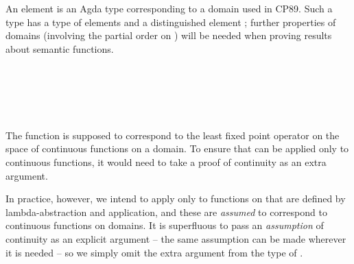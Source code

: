 \begin{AgdaAlign}
An element  is an Agda type corresponding to a domain used in CP89.
Such a type  has a type of elements 
and a distinguished element ;
further properties of domains
(involving the partial order on )
will be needed when proving results about semantic functions.
%
\begin{code}%
\>[0]\AgdaSpace{}%
\<%
\\
\>[0][@{}l@{\AgdaIndent{0}}]%
\>[4]\AgdaSymbol{(}\AgdaSpace{}%
%
\>[14]\AgdaSymbol{:}%
\>[17]\AgdaSpace{}%
\AgdaSymbol{)}\<%
\\
%
\>[4]\AgdaSymbol{(}\AgdaSpace{}%
%
\>[14]\AgdaSymbol{:}%
\>[17]\AgdaSpace{}%
\AgdaSpace{}%
\AgdaSpace{}%
\AgdaSymbol{)}\<%
\\
%
\>[4]\AgdaSymbol{(}\AgdaSpace{}%
%
\>[14]\AgdaSymbol{:}%
\>[17]\AgdaSymbol{\{}\AgdaSpace{}%
\AgdaSymbol{:}\AgdaSpace{}%
\AgdaSymbol{\}}\AgdaSpace{}%
\AgdaSpace{}%
\AgdaSpace{}%
\AgdaSpace{}%
\AgdaSpace{}%
\AgdaSymbol{)}\<%
\\
%
\>[4]\AgdaSymbol{(}\AgdaSpace{}%
%
\>[14]\AgdaSymbol{:}%
\>[17]\AgdaSymbol{\{}\AgdaSpace{}%
\AgdaSymbol{:}\AgdaSpace{}%
\AgdaSymbol{\}}\AgdaSpace{}%
\AgdaSpace{}%
\AgdaSymbol{(}\AgdaSpace{}%
\AgdaSpace{}%
\AgdaSpace{}%
\AgdaSpace{}%
\AgdaSpace{}%
\AgdaSpace{}%
\AgdaSpace{}%
\AgdaSpace{}%
\AgdaSymbol{)}\AgdaSpace{}%
\AgdaSpace{}%
\AgdaSpace{}%
\AgdaSpace{}%
\AgdaSpace{}%
\AgdaSymbol{)}\<%
\end{code}
%
The function  is supposed to correspond to the least fixed point operator
on the space of continuous functions on a domain.
To ensure that  can be applied only to continuous functions,
it would need to take a proof of continuity as an extra argument.

In practice, however, we intend to apply  only to functions on 
that are defined by lambda-abstraction and application, 
and these are \emph{assumed} to correspond to continuous functions on domains.
It is superfluous to pass an \emph{assumption} of continuity as an explicit argument
– the same assumption can be made wherever it is needed
– so we simply omit the extra argument from the type of .


\end{AgdaAlign}
